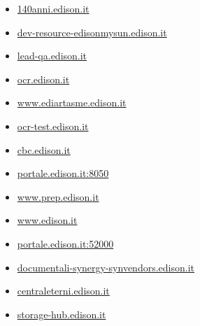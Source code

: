 \documentclass{article}
\begin{document}
\begin{itemize}
            
            \item \href{ https://140anni.edison.it/ }{ 140anni.edison.it }
        
            
            \item \href{ https://dev-resource-edisonmysun.edison.it/ }{ dev-resource-edisonmysun.edison.it }
        
            
            \item \href{ http://lead-qa.edison.it/ }{ lead-qa.edison.it }
        
            
            \item \href{ http://ocr.edison.it/ }{ ocr.edison.it }
        
            
            \item \href{ http://www.ediartasme.edison.it/ }{ www.ediartasme.edison.it }
        
            
            \item \href{ http://ocr-test.edison.it/ }{ ocr-test.edison.it }
        
            
            \item \href{ http://cbc.edison.it/ }{ cbc.edison.it }
        
            
            \item \href{ https://portale.edison.it:8050/sap(bD1pdCZjPTIyMCZkPW1pbg==)/bc/bsp/sap/zpqf\_bsp\_app/initial\_it.htm }{ portale.edison.it:8050 }
        
            
            \item \href{ http://www.prep.edison.it/ }{ www.prep.edison.it }
        
            
            \item \href{ https://www.edison.it/it }{ www.edison.it }
        
            
            \item \href{ https://portale.edison.it:52000/irj/portal }{ portale.edison.it:52000 }
        
            
            \item \href{ https://documentali-synergy-synvendors.edison.it/account/login?ReturnUrl=\%2Fvefa\%2Fhome }{ documentali-synergy-synvendors.edison.it }
        
            
            \item \href{ http://centraleterni.edison.it/ }{ centraleterni.edison.it }
        
            
            \item \href{ http://storage-hub.edison.it/ }{ storage-hub.edison.it }
        

\end{itemize}
\end{document}
